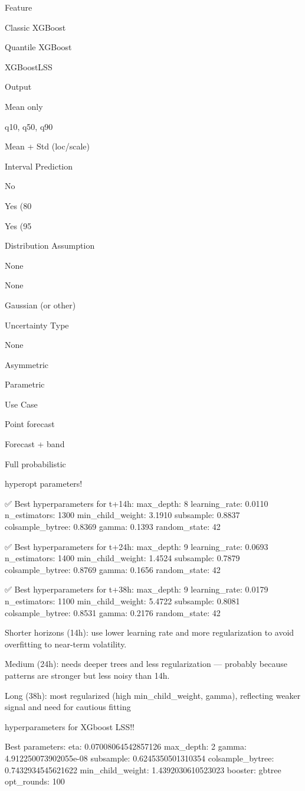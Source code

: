 Feature

Classic XGBoost

Quantile XGBoost

XGBoostLSS

Output

Mean only

q10, q50, q90

Mean + Std (loc/scale)

Interval Prediction

No

Yes (80%

Yes (95%

Distribution Assumption

None

None

Gaussian (or other)

Uncertainty Type

None

Asymmetric

Parametric

Use Case

Point forecast

Forecast + band

Full probabilistic



hyperopt parameters!

✅ Best hyperparameters for t+14h:
max_depth: 8
learning_rate: 0.0110
n_estimators: 1300
min_child_weight: 3.1910
subsample: 0.8837
colsample_bytree: 0.8369
gamma: 0.1393
random_state: 42

✅ Best hyperparameters for t+24h:
max_depth: 9
learning_rate: 0.0693
n_estimators: 1400
min_child_weight: 1.4524
subsample: 0.7879
colsample_bytree: 0.8769
gamma: 0.1656
random_state: 42

✅ Best hyperparameters for t+38h:
max_depth: 9
learning_rate: 0.0179
n_estimators: 1100
min_child_weight: 5.4722
subsample: 0.8081
colsample_bytree: 0.8531
gamma: 0.2176
random_state: 42

Shorter horizons (14h): use lower learning rate and more regularization to avoid overfitting to near-term volatility.

Medium (24h): needs deeper trees and less regularization — probably because patterns are stronger but less noisy than 14h.

Long (38h): most regularized (high min_child_weight, gamma), reflecting weaker signal and need for cautious fitting


hyperparameters for XGboost LSS!!

Best parameters:
eta: 0.07008064542857126
max_depth: 2
gamma: 4.912250073902055e-08
subsample: 0.6245350501310354
colsample_bytree: 0.7432934545621622
min_child_weight: 1.4392030610523023
booster: gbtree
opt_rounds: 100